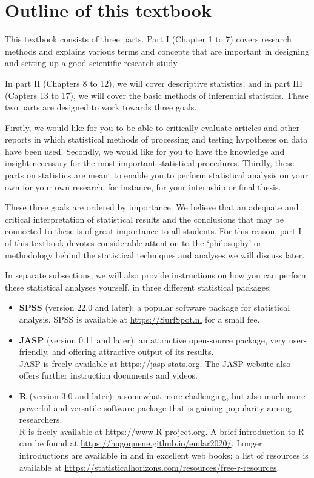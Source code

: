 \documentclass[
]{book}
\begin{document}
\section{Outline of this textbook}\label{sec:intro-outline}

This textbook consists of three parts. Part I (Chapter 1 to 7) covers research methods and explains various terms and concepts that are important in designing and setting up a good scientific research study.

In part II (Chapters 8 to 12), we will cover descriptive statistics, and in part III (Capters 13 to 17), we will cover the basic methods of inferential statistics. These two parts are designed to work towards three goals.

Firstly, we would like for you to be able to critically evaluate articles and other reports in which statistical methods of processing and testing hypotheses on data have been used.
Secondly, we would like for you to have the knowledge and insight necessary for the most important statistical procedures. Thirdly, these parts on statistics are meant to enable you to perform statistical analysis on your own for your own research, for instance, for your internship or final thesis.

These three goals are ordered by importance. We believe that an adequate and critical interpretation of statistical results and the conclusions that may be connected to these is of great importance to all students. For this reason, part I of this textbook devotes considerable attention to the `philosophy' or methodology behind the statistical techniques and analyses we will discuss later.

In separate subsections, we will also provide instructions on how you can perform these statistical analyses yourself, in three different statistical packages:

\begin{itemize}
\item
  \textbf{SPSS} (version 22.0 and later): a popular software package for statistical analysis.
  SPSS is available at \url{https://SurfSpot.nl} for a small fee.
\item
  \textbf{JASP} (version 0.11 and later): an attractive open-source package, very user-friendly, and offering attractive output of its results.\\
  JASP is freely available at \url{https://jasp-stats.org}. The JASP website also offers further instruction documents and videos.
\item
  \textbf{R} (version 3.0 and later): a somewhat more challenging, but also much more powerful and versatile software package that is gaining popularity among researchers.\\
  R is freely available at \url{https://www.R-project.org}.
  A brief introduction to R can be found at \url{https://hugoquene.github.io/emlar2020/}.
  Longer introductions are available in \citet{Dalg02} and in excellent web books; a list of resources is available at
  \url{https://statisticalhorizons.com/resources/free-r-resources}.
\end{itemize}
\end{document}
